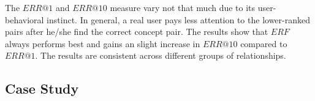 


The $ERR@1$ and $ERR@10$ measure vary not that much due to its user-behavioral instinct. In general, a real user pays less attention to the lower-ranked pairs after he/she find the correct concept pair.
The results show that 
 $ERF$ always performs best and gains an slight increase in $ERR@10$ compared to $ERR@1$.
 The results are consistent across different groups of relationships.




\subsection{Case Study}

